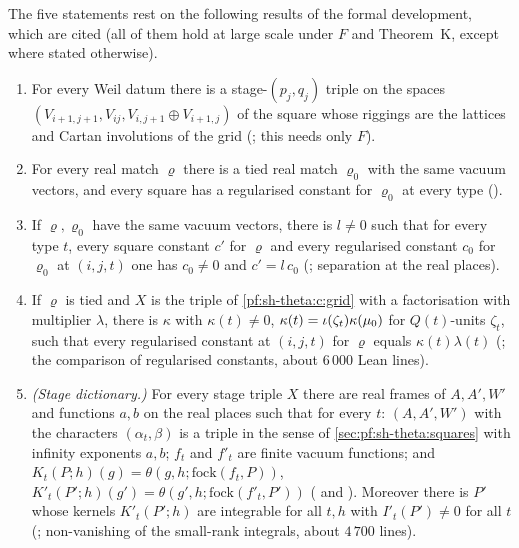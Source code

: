 The five statements rest on the following results of the formal development, which are cited (all of them hold at large
scale under $F$ and Theorem~K, except where stated otherwise).
\begin{enumerate}[label=(\roman*),leftmargin=*]
\item\label{pf:sh-theta:c:grid} For every Weil datum there is a stage-$(p_j,q_j)$ triple on the spaces
$(V_{i+1,j+1},V_{ij},V_{i,j+1}\oplus V_{i+1,j})$ of the square whose riggings are the lattices and Cartan involutions of
the grid (; this needs only $F$).
\item\label{pf:sh-theta:c:tied} For every real match $\varrho$ there is a tied real match $\varrho_0$ with the same vacuum
vectors, and every square has a regularised constant for $\varrho_0$ at every type
().
\item\label{pf:sh-theta:c:real} If $\varrho,\varrho_0$ have the same vacuum vectors, there is $l\ne0$ such that for every type
$t$, every square constant $c'$ for $\varrho$ and every regularised constant $c_0$ for $\varrho_0$ at $(i,j,t)$ one has
$c_0\ne0$ and $c'=l\,c_0$ (; separation at the real places).
\item\label{pf:sh-theta:c:reg} If $\varrho$ is tied and $X$ is the triple of \ref{pf:sh-theta:c:grid} with a factorisation with
multiplier $\lambda$, there is $\kappa$ with $\kappa(t)\ne0$, $\kappa(t)=\iota(\zeta_t)\kappa(\mu_0)$ for $Q(t)$-units
$\zeta_t$, such that every regularised constant at $(i,j,t)$ for $\varrho$ equals $\kappa(t)\lambda(t)$
(; the comparison of regularised constants, about $6\,000$ Lean
lines).
\item\label{pf:sh-theta:c:stage} \emph{(Stage dictionary.)} For every stage triple $X$ there are real frames of $A,A',W'$ and
functions $a,b$ on the real places such that for every $t$: $(A,A',W')$ with the characters $(\alpha_t,\beta)$ is a triple in the
sense of \cref{sec:pf:sh-theta:squares} with infinity exponents $a,b$; $f_t$ and $f'_t$ are finite vacuum functions; and
$K_t(P;h)(g)=\theta(g,h;\mathrm{fock}(f_t,P))$, $K'_t(P';h)(g')=\theta(g',h;\mathrm{fock}(f'_t,P'))$
( and ).
Moreover there is $P'$ whose kernels $K'_t(P';h)$ are integrable for all $t,h$ with $I'_t(P')\ne0$ for all $t$
(; non-vanishing of the small-rank integrals, about $4\,700$ lines).

\end{enumerate}
